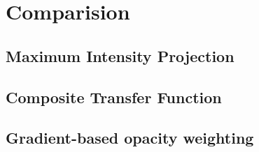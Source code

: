 \section{Comparision}\label{Sec:Com}
\subsection{Maximum Intensity Projection }


\subsection{Composite Transfer Function }


\subsection{Gradient-based opacity weighting }